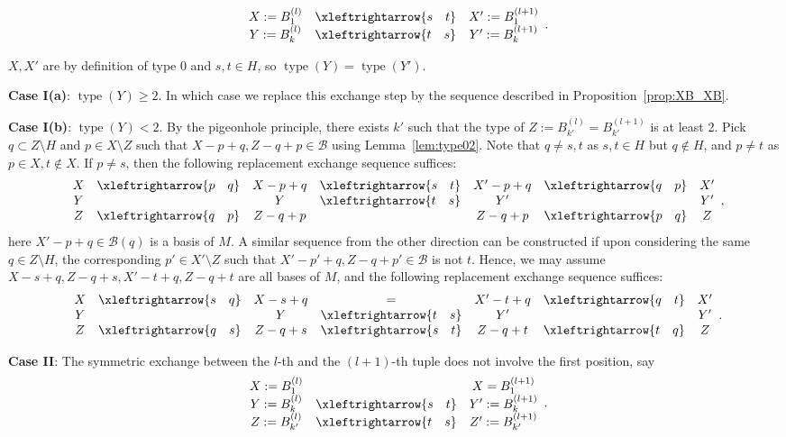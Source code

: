 \documentclass{amsart}
\newcommand{\swap}[2]{\xleftrightarrow{#1 \quad #2}}
\newcommand\Bcal{{\mathcal B}}
\DeclareMathOperator{\type}{type}
\begin{document}
$$
\begin{array}{c c c}
   X:=B_1^{(l)} & \swap{s}{t} & X':=B_1^{(l+1)} \\
   Y:=B_k^{(l)} & \swap{t}{s} & Y':=B_k^{(l+1)}
\end{array}.
$$

$X,X'$ are by definition of type 0 and $s,t\in H$, so $\type(Y)=\type(Y')$.

{\bf Case I(a)}: $\type(Y)\geq 2$. In which case we replace this exchange step by the sequence described in Proposition~\ref{prop:XB_XB}.

{\bf Case I(b)}: $\type(Y)<2$. By the pigeonhole principle, there exists $k'$ such that the type of $Z:=B_{k'}^{(l)}=B_{k'}^{(l+1)}$ is at least 2. Pick $q\subset Z\setminus H$ and $p\in X\setminus Z$ such that $X-p+q,Z-q+p\in\Bcal$ using Lemma~\ref{lem:type02}. Note that $q\neq s,t$ as $s,t\in H$ but $q\not\in H$, and $p\neq t$ as $p\in X, t\not\in X$. If $p\neq s$, then the following replacement exchange sequence suffices:
$$
\begin{array}{c c c c c c c}
   X & \swap{p}{q} & X-p+q & \swap{s}{t} & X'-p+q & \swap{q}{p}   & X' \\
   Y &            & Y &  \swap{t}{s}  & Y' &            & Y' \\
   Z & \swap{q}{p}  & Z-q+p &          & Z-q+p  & \swap{p}{q}  & Z
\end{array},
$$
here $X'-p+q\in\Bcal(q)$ is a basis of $M$. A similar sequence from the other direction can be constructed if upon considering the same $q\in Z\setminus H$, the corresponding $p'\in X'\setminus Z$ such that $X'-p'+q,Z-q+p'\in\Bcal$ is not $t$. Hence, we may assume $X-s+q,Z-q+s,X'-t+q,Z-q+t$ are all bases of $M$, and the following replacement exchange sequence suffices:
$$
\begin{array}{c c c c c c c}
   X & \swap{s}{q} & X-s+q & =      & X'-t+q & \swap{q}{t}   & X' \\
   Y &            & Y &  \swap{t}{s}  & Y' &            & Y' \\
   Z & \swap{q}{s}  & Z-q+s & \swap{s}{t}  & Z-q+t  & \swap{t}{q}  & Z
\end{array}.
$$

{\bf Case II}: The symmetric exchange between the $l$-th and the $(l+1)$-th tuple does not involve the first position, say
$$
\begin{array}{c c c}
   X:=B_1^{(l)} &            & X=B_1^{(l+1)} \\ 
   Y:=B_k^{(l)} & \swap{s}{t} & Y':=B_k^{(l+1)} \\
   Z:=B_{k'}^{(l)}           & \swap{t}{s} & Z':=B_{k'}^{(l+1)}
\end{array}.
$$
\end{document}
